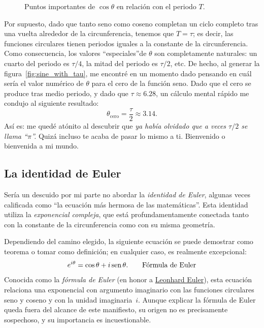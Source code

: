 \begin{figure}
\begin{center}
\end{center}
\caption{Puntos importantes de $\cos\theta$ en relación con el periodo $T$.\label{fig:cosine_with_tau}}
\end{figure}


Por supuesto, dado que tanto seno como coseno completan un ciclo completo tras una vuelta alrededor de la circunferencia, tenemos que $T = \tau$; es decir, las funciones circulares tienen periodos iguales a la constante de la circunferencia. Como consecuencia, los valores ``especiales''de $\theta$ son completamente naturales: un cuarto del periodo es $\tau/4$, la mitad del periodo es $\tau/2$, etc. De hecho, al generar la figura~\ref{fig:sine_with_tau}, me encontré en un momento dado pensando en cuál sería el valor numérico de $\theta$ para el cero de la función seno. Dado que el cero se produce tras medio periodo, y dado que $\tau \approx 6.28$, un cálculo mental rápido me condujo al siguiente resultado:
\[
  \theta_\mathrm{cero} = \frac{\tau}{2} \approx 3.14.
\]
Así es: me quedé atónito al descubrir que \emph{ya había olvidado que a veces $\tau/2$ se llama ``$\pi$''.} Quizá incluso te acaba de pasar lo mismo a ti. Bienvenido o bienvenida a mi mundo.



   \subsection{La identidad de Euler} %
   \label{sec:euler_s_identity}

Sería un descuido por mi parte no abordar la \emph{identidad de Euler}, algunas veces calificada como ``la ecuación más hermosa de las matemáticas''. Esta identidad utiliza la \emph{exponencial compleja}, que está profundamentamente conectada tanto con la constante de la circunferencia como con su misma geometría.

Dependiendo del camino elegido, la siguiente ecuación se puede demostrar como teorema o tomar como definición; en cualquier caso, es realmente excepcional:
\begin{equation}
\label{eq:eulers_formula}
e^{i\theta} = \cos\theta + i\,\mbox{sen}\,\theta. \qquad\mbox{Fórmula de Euler}
\end{equation}
Conocida como la \emph{fórmula de Euler} (en honor a \href{https://es.wikipedia.org/wiki/Leonhard_Euler}{Leonhard Euler}), esta ecuación relaciona una exponencial con argumento imaginario con las funciones circulares seno y coseno y con la unidad imaginaria~$i$. Aunque explicar la fórmula de Euler queda fuera del alcance de este manifiesto, su origen no es precisamente sospechoso, y su importancia es incuestionable.

